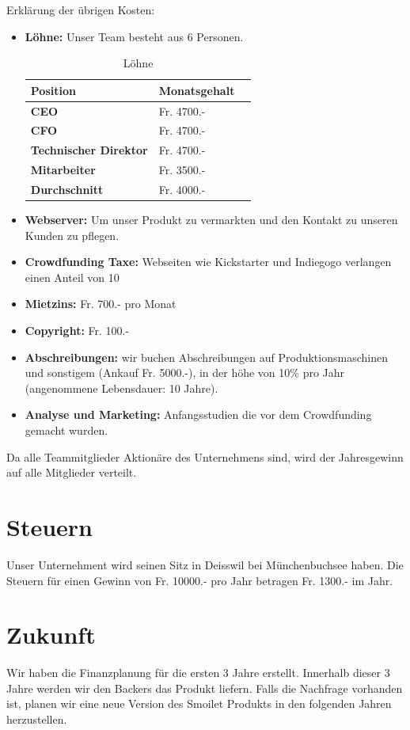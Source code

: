 Erkl\"arung der \"ubrigen Kosten:\\
\begin{itemize}
\item \textbf{L\"ohne:} Unser Team besteht aus 6 Personen. \\
\begin{table}[H]
\centering
\caption{L\"ohne}
\label{L\"ohne}
\begin{tabular}{lll}
\textbf{Position} & \textbf{Monatsgehalt}  \\ \hline
  \textbf{CEO} &  Fr. 4700.- \\ \hline
 \textbf{CFO} &  Fr. 4700.- \\ \hline
 \textbf{Technischer Direktor}& Fr. 4700.-  \\ \hline
 \textbf{Mitarbeiter} &Fr.  3500.- \\ \hline
 \textbf{Durchschnitt} & Fr. 4000.-\\ \hline
\end{tabular}
\end{table}
\item \textbf{Webserver:} Um unser Produkt zu vermarkten und den Kontakt zu unseren Kunden zu pflegen.

\item \textbf{Crowdfunding Taxe:} Webseiten wie Kickstarter und Indiegogo verlangen einen Anteil von 10%
\item \textbf{Mietzins:} Fr. 700.- pro Monat
\item \textbf{Copyright:} Fr. 100.-
\item \textbf{Abschreibungen:} wir buchen Abschreibungen auf Produktionsmaschinen und sonstigem (Ankauf Fr. 5000.-), in der h\"ohe von 10\% pro Jahr (angenommene Lebensdauer: 10 Jahre).
\item \textbf{Analyse und Marketing:} Anfangsstudien die vor dem Crowdfunding gemacht wurden.
\end{itemize}
Da alle Teammitglieder Aktion\"are des Unternehmens sind, wird der Jahresgewinn auf alle Mitglieder verteilt.
\section{Steuern}
Unser Unternehment wird seinen Sitz in Deisswil bei M\"unchenbuchsee haben. Die Steuern f\"ur einen Gewinn von Fr. 10000.- pro Jahr betragen Fr. 1300.- im Jahr.
\section{Zukunft}
Wir haben die Finanzplanung f\"ur die ersten 3 Jahre erstellt. Innerhalb dieser 3 Jahre werden wir den Backers das Produkt liefern. Falls die Nachfrage vorhanden ist, planen wir eine neue Version des Smoilet Produkts in den folgenden Jahren herzustellen. 

